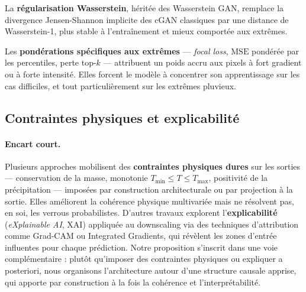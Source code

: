 \documentclass[14pt,a4paper,openany]{extreport}
\theoremstyle{definition}
\begin{document}
La \textbf{régularisation Wasserstein}, héritée des Wasserstein GAN, remplace la divergence Jensen-Shannon implicite des cGAN classiques par une distance de Wasserstein-1, plus stable à l'entraînement et mieux comportée aux extrêmes.

Les \textbf{pondérations spécifiques aux extrêmes} --- \emph{focal loss}, $\mathrm{MSE}$ pondérée par les percentiles, perte top-$k$ --- attribuent un poids accru aux pixels à fort gradient ou à forte intensité. Elles forcent le modèle à concentrer son apprentissage sur les cas difficiles, et tout particulièrement sur les extrêmes pluvieux.

\subsection{Contraintes physiques et explicabilité}
\label{ssec:soa-physics-xai}

\paragraph{Encart court.}
Plusieurs approches mobilisent des \textbf{contraintes physiques dures} sur les sorties --- conservation de la masse, monotonie $T_{\min} \leq T \leq T_{\max}$, positivité de la précipitation --- imposées par construction architecturale ou par projection à la sortie. Elles améliorent la cohérence physique multivariée mais ne résolvent pas, en soi, les verrous probabilistes. D'autres travaux explorent l'\textbf{explicabilité} (\emph{eXplainable AI}, XAI) appliquée au downscaling via des techniques d'attribution comme Grad-CAM ou Integrated Gradients, qui révèlent les zones d'entrée influentes pour chaque prédiction. Notre proposition s'inscrit dans une voie complémentaire : plutôt qu'imposer des contraintes physiques ou expliquer a posteriori, nous organisons l'architecture autour d'une structure causale apprise, qui apporte par construction à la fois la cohérence et l'interprétabilité.
\end{document}
